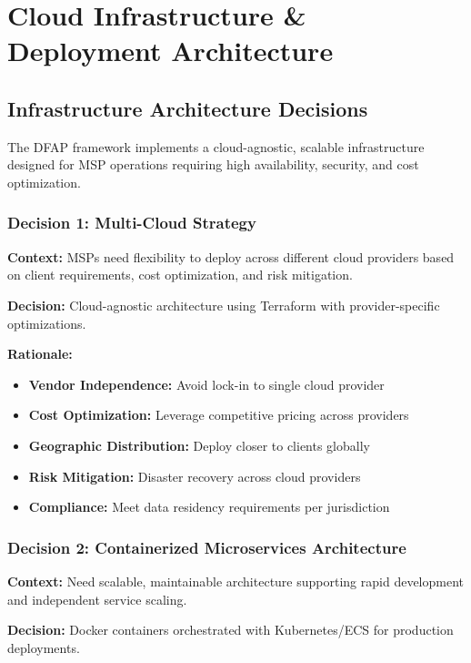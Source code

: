 \section{Cloud Infrastructure \& Deployment Architecture}

\subsection{Infrastructure Architecture Decisions}

The DFAP framework implements a cloud-agnostic, scalable infrastructure designed for MSP operations requiring high availability, security, and cost optimization.

\subsubsection{Decision 1: Multi-Cloud Strategy}

\textbf{Context:} MSPs need flexibility to deploy across different cloud providers based on client requirements, cost optimization, and risk mitigation.

\textbf{Decision:} Cloud-agnostic architecture using Terraform with provider-specific optimizations.

\textbf{Rationale:}
\begin{itemize}
  \item \textbf{Vendor Independence:} Avoid lock-in to single cloud provider
  \item \textbf{Cost Optimization:} Leverage competitive pricing across providers
  \item \textbf{Geographic Distribution:} Deploy closer to clients globally
  \item \textbf{Risk Mitigation:} Disaster recovery across cloud providers
  \item \textbf{Compliance:} Meet data residency requirements per jurisdiction
\end{itemize}

\subsubsection{Decision 2: Containerized Microservices Architecture}

\textbf{Context:} Need scalable, maintainable architecture supporting rapid development and independent service scaling.

\textbf{Decision:} Docker containers orchestrated with Kubernetes/ECS for production deployments.

